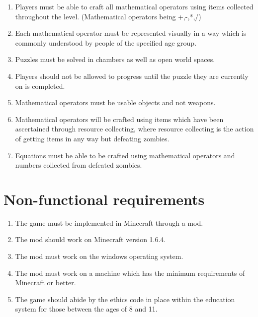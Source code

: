 \begin{enumerate}
	\item Players must be able to craft all mathematical operators using items collected throughout the level. (Mathematical operators being +,-,*,/) 
	
	\item Each mathematical operator must be represented visually in a way which is commonly understood by people of the specified age group.
	
	\item Puzzles must be solved in chambers as well as open world spaces.
	
	\item Players should not be allowed to progress until the puzzle they are currently on is completed.
	
	\item Mathematical operators must be usable objects and not weapons.
	
	\item Mathematical operators will be crafted using items which have been ascertained through resource collecting, where resource collecting is the action of getting items in any way but defeating zombies.
	
	\item Equations must be able to be crafted using mathematical operators and numbers collected from defeated zombies.
		
\end{enumerate}

\section{Non-functional requirements}
\begin{enumerate}
	\item The game must be implemented in Minecraft through a mod.
	\item The mod should work on Minecraft version 1.6.4.
	\item The mod must work on the windows operating system.
	\item The mod must work on a machine which has the minimum requirements of Minecraft or better.
	\item The game should abide by the ethics code in place within the education system for those between the ages of 8 and 11.
\end{enumerate}

